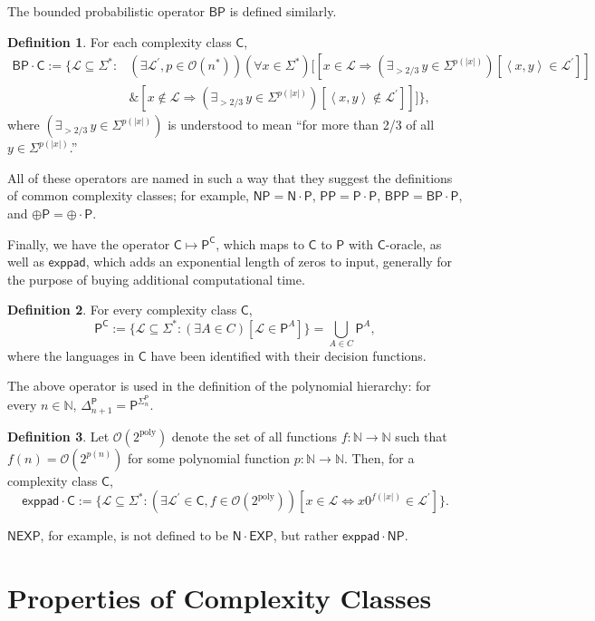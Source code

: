\documentclass[12pt]{amsart}
\theoremstyle{definition}
\newtheorem*{definition}{Definition}
\theoremstyle{remark}
\newcommand{\N}{\mathbb{N}}
\newcommand{\ra}{\rightarrow}
\newcommand{\cL}{\mathcal{L}}
\newcommand{\sC}{\mathsf{C}}
\newcommand{\NP}{\mathsf{NP}}
\newcommand{\sP}{\mathsf{P}}
\newcommand{\msf}[1]{\mathsf{#1}}
\newcommand{\AND}{\mathbin{\&}}
\newcommand{\Oh}{\mathcal{O}}
\newcommand{\inner}[1]{\left\langle#1\right\rangle}
\newcommand{\sN}{\msf{N}}
\newcommand{\BP}{\msf{BP}}
\newcommand{\exppad}{\msf{exppad}}
\begin{document}
The bounded probabilistic operator $\BP$ is defined similarly.
\begin{definition}
For each complexity class $\sC$,
\begin{align*}
\BP\cdot\sC:=\{\cL\subseteq\Sigma^*:&(\exists\cL^\prime,p\in\Oh(n^*))(\forall
x\in\Sigma^*)[[x\in\cL\Longrightarrow
(\exists_{>2/3}\hspace{2pt}y\in\Sigma^{p(|x|)})[\inner{x,y}\in\cL^\prime]] \\
&\AND[x\notin\cL\Longrightarrow(\exists_{>2/3}\hspace{2pt}y\in\Sigma^{p(|x|)})
[\inner{x,y}\notin\cL^\prime]]]\},
\end{align*}
where $(\exists_{>2/3}\hspace{2pt}y\in\Sigma^{p(|x|)})$ is understood to
mean ``for more than 2/3 of all $y\in\Sigma^{p(|x|)}$.''
\end{definition}
All of these operators are named in such a way that they suggest the definitions
of common complexity classes; for example, $\NP=\sN\cdot\sP$,
$\sP\sP=\sP\cdot\sP$, $\msf{BPP}=\BP\cdot\sP$, and $\oplus\sP=\oplus\cdot\sP$.

Finally, we have the operator $\sC\mapsto\sP^\sC$, which maps to $\sC$ to $\sP$
with $\sC$-oracle, as well as $\exppad$, which adds an exponential length of
zeros to input, generally for the purpose of buying additional computational
time.
\begin{definition}
For every complexity class $\sC$,
\[
\sP^\sC:=\{\cL\subseteq\Sigma^*:(\exists A\in C)[\cL\in\sP^A]\}=\bigcup_{A\in
  C}\sP^A,
\]
where the languages in $\sC$ have been identified with their decision
functions.
\end{definition}
The above operator is used in the definition of the polynomial hierarchy: for
every $n\in\N$, $\Delta_{n+1}^\sP=\sP^{\Sigma_n^\sP}$.
\begin{definition}
Let $\Oh(2^\text{poly})$ denote the set of all functions $f:\N\ra\N$ such that
$f(n)=\Oh(2^{p(n)})$ for some polynomial function $p:\N\ra\N$. Then, for a
complexity class $\sC$,
\[
\exppad\cdot\sC:=\{\cL\subseteq\Sigma^*:(\exists\cL^\prime\in\sC,f\in
\Oh(2^\text{poly}))[x\in\cL\Longleftrightarrow x0^{f(|x|)}\in\cL^\prime]\}.
\]
\end{definition}
$\msf{NEXP}$, for example, is not defined to  be $\sN\cdot\msf{EXP}$, but rather
$\exppad\cdot\NP$.

\section{Properties of Complexity Classes}
\end{document}
